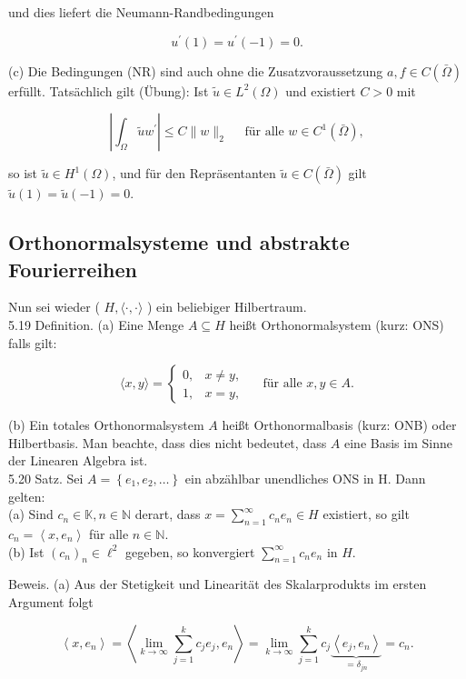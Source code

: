 \documentclass[10pt, letterpaper]{article}
\begin{document}
und dies liefert die Neumann-Randbedingungen

$$
u^{\prime}(1)=u^{\prime}(-1)=0 .
$$

(c) Die Bedingungen (NR) sind auch ohne die Zusatzvoraussetzung $a, f \in C(\bar{\Omega})$ erfüllt. Tatsächlich gilt (Übung): Ist $\tilde{u} \in L^{2}(\Omega)$ und existiert $C>0$ mit

$$
\left|\int_{\Omega} \tilde{u} w^{\prime}\right| \leq C\|w\|_{2} \quad \text { für alle } w \in C^{1}(\bar{\Omega}),
$$

so ist $\tilde{u} \in H^{1}(\Omega)$, und für den Repräsentanten $\tilde{u} \in C(\bar{\Omega})$ gilt $\tilde{u}(1)=\tilde{u}(-1)=0$.

\subsection*{Orthonormalsysteme und abstrakte Fourierreihen}
Nun sei wieder ( $H,\langle\cdot, \cdot\rangle$ ) ein beliebiger Hilbertraum.\\
5.19 Definition. (a) Eine Menge $A \subseteq H$ heißt Orthonormalsystem (kurz: ONS) falls gilt:

$$
\langle x, y\rangle=\left\{\begin{array}{ll}
0, & x \neq y, \\
1, & x=y,
\end{array} \quad \text { für alle } x, y \in A .\right.
$$

(b) Ein totales Orthonormalsystem $A$ heißt Orthonormalbasis (kurz: ONB) oder Hilbertbasis. Man beachte, dass dies nicht bedeutet, dass $A$ eine Basis im Sinne der Linearen Algebra ist.\\
5.20 Satz. Sei $A=\left\{e_{1}, e_{2}, \ldots\right\}$ ein abzählbar unendliches ONS in H. Dann gelten:\\
(a) Sind $c_{n} \in \mathbb{K}, n \in \mathbb{N}$ derart, dass $x=\sum_{n=1}^{\infty} c_{n} e_{n} \in H$ existiert, so gilt $c_{n}=\left\langle x, e_{n}\right\rangle$ für alle $n \in \mathbb{N}$.\\
(b) Ist $\left(c_{n}\right)_{n} \in \ell^{2}$ gegeben, so konvergiert $\sum_{n=1}^{\infty} c_{n} e_{n}$ in $H$.

Beweis. (a) Aus der Stetigkeit und Linearität des Skalarprodukts im ersten Argument folgt

$$
\left\langle x, e_{n}\right\rangle=\left\langle\lim _{k \rightarrow \infty} \sum_{j=1}^{k} c_{j} e_{j}, e_{n}\right\rangle=\lim _{k \rightarrow \infty} \sum_{j=1}^{k} c_{j} \underbrace{\left\langle e_{j}, e_{n}\right\rangle}_{=\delta_{j n}}=c_{n} .
$$
\end{document}
